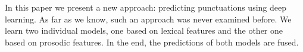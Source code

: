 In this paper we present a new approach: predicting punctuations using deep learning.
As far as we know, such an approach was never examined before.
We learn two individual models, one based on lexical features and the other one based on prosodic features.
In the end, the predictions of both models are fused.


